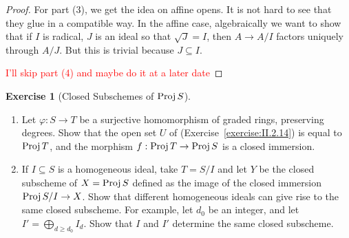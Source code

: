 \documentclass[]{pcmi}
\theoremstyle{plain}
\theoremstyle{definition}
\newtheorem{Exercise}[subsubsection]{Exercise}
\theoremstyle{remark}
\begin{document}
\begin{proof}
    For part (3), we get the idea on affine opens. It is not hard to see that they glue in a compatible way. In the affine case, algebraically we want to show that if $I$ is radical, $J$ is an ideal so that $\sqrt{J} = I$, then $A \to A/I$ factors uniquely through $A/J$. But this is trivial because $J \subseteq I$.
    
    \textcolor{red}{I'll skip part (4) and maybe do it at a later date}
\end{proof}

\begin{Exercise}[Closed Subschemes of $\operatorname{Proj} S$]
    \phantom{h}
    \begin{enumerate}[label = (\alph*)]
        \item Let $\varphi : S \to T$ be a surjective homomorphism of graded rings, preserving degrees. Show that the open set $U$ of (Exercise~\ref{exercise:II.2.14}) is equal to $\operatorname{Proj} T$, and the morphism $f : \operatorname{Proj} T \to \operatorname{Proj} S$ is a closed immersion. 
        \item If $I \subseteq S$ is a homogeneous ideal, take $T = S/I$ and let $Y$ be the closed subscheme of $X = \operatorname{Proj} S$ defined as the image of the closed immersion $\operatorname{Proj} S/I \to X$. Show that different homogeneous ideals can give rise to the same closed subscheme. For example, let $d_0$ be an integer, and let $I' = \bigoplus_{d \geq d_0} I_d$. Show that $I$ and $I'$ determine the same closed subscheme. 
    \end{enumerate}
\end{Exercise}
\end{document}
